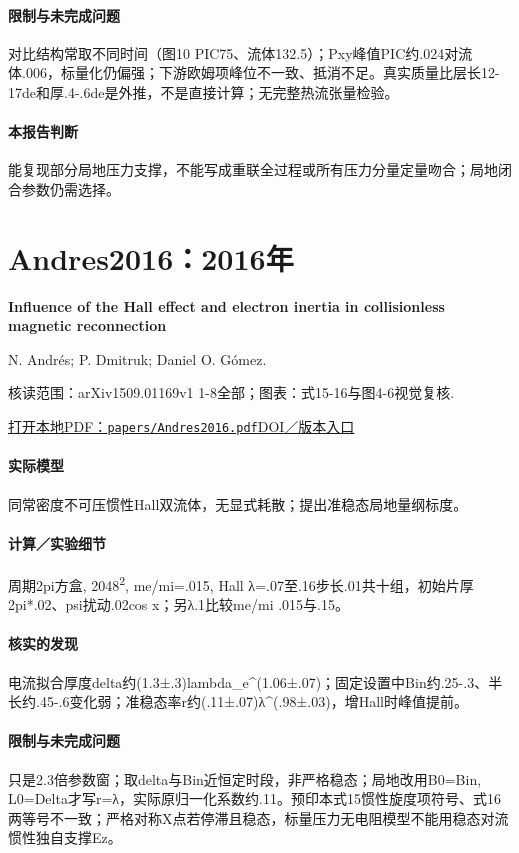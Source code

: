 \paragraph{限制与未完成问题}对比结构常取不同时间（图10 PIC75、流体132.5）；Pxy峰值PIC约.024对流体.006，标量化仍偏强；下游欧姆项峰位不一致、抵消不足。真实质量比层长12-17de和厚.4-.6de是外推，不是直接计算；无完整热流张量检验。

\paragraph{本报告判断}能复现部分局地压力支撑，不能写成重联全过程或所有压力分量定量吻合；局地闭合参数仍需选择。

\section{Andres2016：2016年}\label{paper:Andres2016}

\textbf{Influence of the Hall effect and electron inertia in collisionless magnetic reconnection}\citep{Andres2016}\

N. Andrés;  P. Dmitruk;  Daniel O. Gómez.

\textsf{核读范围：}arXiv1509.01169v1 1-8全部；\textsf{图表：}式15-16与图4-6视觉复核.

\href{run:papers/Andres2016.pdf}{打开本地PDF：\texttt{papers/Andres2016.pdf}}\quad\href{https://doi.org/10.1063/1.4942418}{DOI／版本入口}

\paragraph{实际模型}同常密度不可压惯性Hall双流体，无显式耗散；提出准稳态局地量纲标度。

\paragraph{计算／实验细节}周期2pi方盒, 2048\textsuperscript{2}, me/mi=.015, Hall λ=.07至.16步长.01共十组，初始片厚2pi*.02、psi扰动.02cos x；另λ.1比较me/mi .015与.15。

\paragraph{核实的发现}电流拟合厚度delta约(1.3±.3)lambda\_e\textasciicircum{}(1.06±.07)；固定设置中Bin约.25-.3、半长约.45-.6变化弱；准稳态率r约(.11±.07)λ\textasciicircum{}(.98±.03)，增Hall时峰值提前。

\paragraph{限制与未完成问题}只是2.3倍参数窗；取delta与Bin近恒定时段，非严格稳态；局地改用B0=Bin, L0=Delta才写r=λ，实际原归一化系数约.11。预印本式15惯性旋度项符号、式16两等号不一致；严格对称X点若停滞且稳态，标量压力无电阻模型不能用稳态对流惯性独自支撑Ez。

